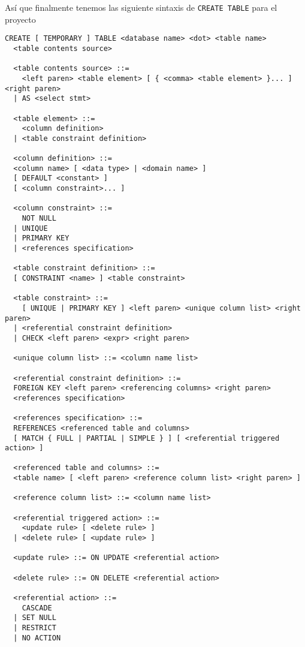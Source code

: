 Así que finalmente tenemos las siguiente sintaxis de \verb=CREATE TABLE= para el proyecto\\

\begin{Verbatim}[frame=single, label=sintaxis para CREATE TABLE]
  CREATE [ TEMPORARY ] TABLE <database name> <dot> <table name> 
  <table contents source>

  <table contents source> ::=
    <left paren> <table element> [ { <comma> <table element> }... ] <right paren>
  | AS <select stmt>
  
  <table element> ::=
    <column definition>
  | <table constraint definition>

  <column definition> ::=
  <column name> [ <data type> | <domain name> ]
  [ DEFAULT <constant> ]
  [ <column constraint>... ]
  
  <column constraint> ::=
    NOT NULL
  | UNIQUE
  | PRIMARY KEY
  | <references specification>

  <table constraint definition> ::=
  [ CONSTRAINT <name> ] <table constraint>

  <table constraint> ::=
    [ UNIQUE | PRIMARY KEY ] <left paren> <unique column list> <right paren>
  | <referential constraint definition>
  | CHECK <left paren> <expr> <right paren>

  <unique column list> ::= <column name list>

  <referential constraint definition> ::=
  FOREIGN KEY <left paren> <referencing columns> <right paren>
  <references specification>
  
  <references specification> ::=
  REFERENCES <referenced table and columns>
  [ MATCH { FULL | PARTIAL | SIMPLE } ] [ <referential triggered action> ]

  <referenced table and columns> ::=
  <table name> [ <left paren> <reference column list> <right paren> ]

  <reference column list> ::= <column name list>

  <referential triggered action> ::=
    <update rule> [ <delete rule> ]
  | <delete rule> [ <update rule> ]

  <update rule> ::= ON UPDATE <referential action>

  <delete rule> ::= ON DELETE <referential action>

  <referential action> ::=
    CASCADE
  | SET NULL
  | RESTRICT
  | NO ACTION


\end{Verbatim}




